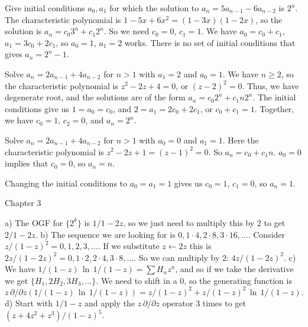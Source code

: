  Give initial conditions $a_0, a_1$
for which the solution to $a_n = 5 a_{n-1} - 6 a_{n-2}$ is $2^n$.\hfil\break
The characteristic polynomial is $1 - 5 x + 6 x^2 = \left(1 - 3 x\right)
\left(1 - 2 x \right)$, so the solution is $a_n = c_0 3^n + c_1 2^n$.
So we need $c_0 = 0$, $c_1 = 1$.  We have $a_0 = c_0 + c_1$,
$a_1 = 3 c_0 + 2 c_1$, so $a_0 = 1$, $a_1 = 2$ works.
There is no set of initial conditions that gives $a_n = 2^n - 1$.

 Solve $a_n = 2 a_{n-1}  + 4 a_{n-2}$
for $n > 1$ with $a_1=2$ and $a_0 = 1$.\hfil\break
We have $n \ge 2$, so the characteristic polynomial is $z^2 - 2 z + 4 = 0$,
or $\left(z -2\right)^2 = 0$.  Thus, we have degenerate root, and the solutions
are of the form $a_n = c_0 2^n + c_1 n 2^n$.  The initial conditions give us
$1 = a_0 = c_0$, and $2 = a_1 = 2 c_0 + 2 c_1$, or $c_0 + c_1 = 1$.
Together, we have $c_0 = 1$, $c_2 = 0$, and $a_n = 2^n$.

 Solve $a_n = 2 a_{n-1} + 4 a_{n-2}$
for $n > 1$ with $a_0 = 0$ and $a_1 = 1$.\hfil\break
Here the characteristic polynomial is $z^2 - 2 z + 1 = \left(z - 1\right)^2 = 0$.
So $a_n = c_0 + c_1 n$.  $a_0 = 0$ implies that $c_0 = 0$, so
$a_n = n$.  

Changing the initial conditions to $a_0 = a_1 = 1$ gives us
$c_0 = 1$, $c_1 = 0$, so $a_n = 1$.

\vskip 0.3in
\centerline {Chapter 3}
\vskip 0.2in

\hfil\break
a) The OGF for $\{ 2^k \}$ is $1 / 1 - 2z$, so we just need to multiply
this by 2 to get $2 / 1 - 2 z$. \hfil\break
b) The sequence we are looking for is $0, 1 \cdot 4, 2 \cdot 8, 3 \cdot 16, \ldots$.
Consider $z / \left(1 - z\right)^2 = 0, 1, 2, 3, \ldots$.  If we substitute $z \leftarrow 2 z$
this is $2 z / \left( 1 - 2 z\right)^2 = 0, 1 \cdot 2, 2 \cdot 4, 3 \cdot 8, \ldots$.
So we can multiply by 2: $4 z / \left( 1 - 2 z \right)^2$.\hfil\break
c) We have $1 / \left(1 - z \right) \, {\ln} \, 1 / \left(1 - z\right) = \sum H_n z^n$,
and so if we take the derivative we get $\{H_1, 2 H_2, 3 H_3, \ldots \}$.
We need to shift in a 0, so the generating function is
$z \, \partial / \partial z \left( 1 / \left(1 - z\right) \, \ln \, 1 / \left(1 - z \right) \right) =
z / \left(1 - z \right)^2 + z / \left(1 - z \right)^2 \, \ln \, 1 / \left(1 - z \right).$\hfil\break
d) Start with $1 / 1 - z$ and apply the $z \, \partial / \partial z$ operator 3 times
to get $\left(z + 4 z^2 + z^3\right) / \left(1 - z\right)^5.$

